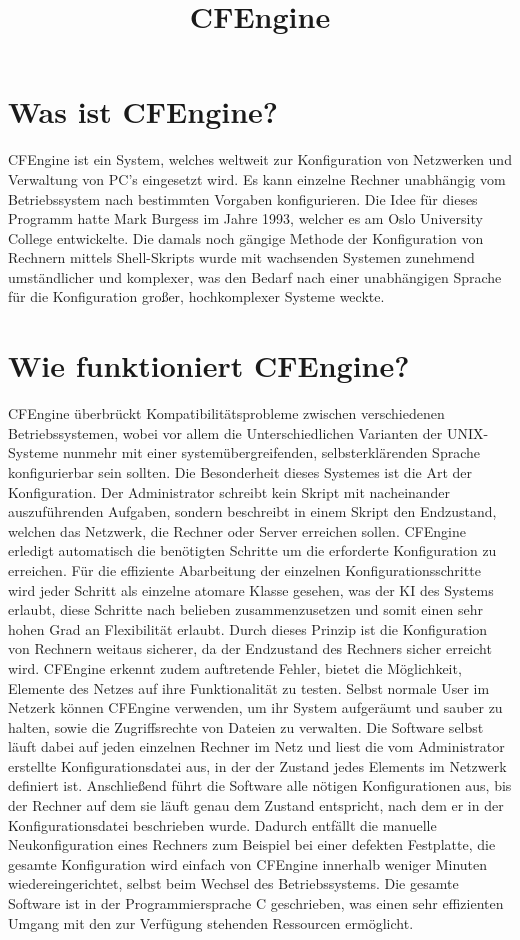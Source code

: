 
\title{CFEngine}
\section{Was ist CFEngine?}
CFEngine ist ein System, welches weltweit zur Konfiguration von Netzwerken und Verwaltung von PC's eingesetzt wird. Es kann einzelne Rechner unabhängig vom Betriebssystem nach bestimmten Vorgaben konfigurieren. Die Idee für dieses Programm hatte Mark Burgess im Jahre 1993, welcher es am Oslo University College entwickelte. Die damals noch gängige Methode der Konfiguration von Rechnern mittels Shell-Skripts wurde mit wachsenden Systemen zunehmend umständlicher und komplexer, was den Bedarf nach einer unabhängigen Sprache für die Konfiguration großer, hochkomplexer Systeme weckte.
\section{Wie funktioniert CFEngine?}
CFEngine überbrückt Kompatibilitätsprobleme zwischen verschiedenen Betriebssystemen, wobei vor allem die Unterschiedlichen Varianten der UNIX-Systeme nunmehr mit einer systemübergreifenden, selbsterklärenden Sprache konfigurierbar sein sollten. Die Besonderheit dieses Systemes ist die Art der Konfiguration. Der Administrator schreibt kein Skript mit nacheinander auszuführenden Aufgaben, sondern beschreibt in einem Skript den Endzustand, welchen das Netzwerk, die Rechner oder Server erreichen sollen. CFEngine erledigt automatisch die benötigten Schritte um die erforderte Konfiguration zu erreichen. Für die effiziente Abarbeitung der einzelnen Konfigurationsschritte wird jeder Schritt als einzelne atomare Klasse gesehen, was der KI des Systems erlaubt, diese Schritte nach belieben zusammenzusetzen und somit einen sehr hohen Grad an Flexibilität erlaubt.
Durch dieses Prinzip ist die Konfiguration von Rechnern weitaus sicherer, da der Endzustand des Rechners sicher erreicht wird. CFEngine erkennt zudem auftretende Fehler, bietet die Möglichkeit, Elemente des Netzes auf ihre Funktionalität zu testen. Selbst normale User im Netzerk können CFEngine verwenden, um ihr System aufgeräumt und sauber zu halten, sowie die Zugriffsrechte von Dateien zu verwalten.
Die Software selbst läuft dabei auf jeden einzelnen Rechner im Netz und liest die vom Administrator erstellte Konfigurationsdatei aus, in der der Zustand jedes Elements im Netzwerk definiert ist. Anschließend führt die Software alle nötigen Konfigurationen aus, bis der Rechner auf dem sie läuft genau dem Zustand entspricht, nach dem er in der Konfigurationsdatei beschrieben wurde. Dadurch entfällt die manuelle Neukonfiguration eines Rechners zum Beispiel bei einer defekten Festplatte, die gesamte Konfiguration wird einfach von CFEngine innerhalb weniger Minuten wiedereingerichtet, selbst beim Wechsel des Betriebssystems.
Die gesamte Software ist in der Programmiersprache C geschrieben, was einen sehr effizienten Umgang mit den zur Verfügung stehenden Ressourcen ermöglicht.
